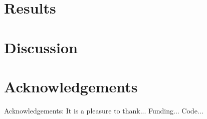 \documentclass[usenatbib]{mnras}
\begin{document}
\section{Results}


\section{Discussion}


\section*{Acknowledgements}
Acknowledgements:
It is a pleasure to thank...
Funding...
Code...





\label{lastpage}
\end{document}
